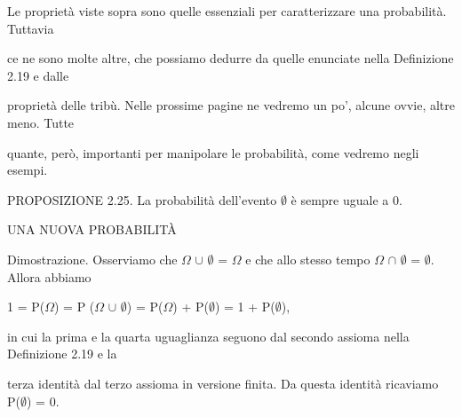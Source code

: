 \documentclass[a4paper,portrait,12pt]{article}
\begin{document}
\begin{flushleft}
Le propriet\`{a} viste sopra sono quelle essenziali per caratterizzare una probabilit\`{a}. Tuttavia
\end{flushleft}


\begin{flushleft}
ce ne sono molte altre, che possiamo dedurre da quelle enunciate nella Definizione 2.19 e dalle
\end{flushleft}


\begin{flushleft}
propriet\`{a} delle tribù. Nelle prossime pagine ne vedremo un po', alcune ovvie, altre meno. Tutte
\end{flushleft}


\begin{flushleft}
quante, per\`{o}, importanti per manipolare le probabilit\`{a}, come vedremo negli esempi.
\end{flushleft}


\begin{flushleft}
PROPOSIZIONE 2.25. La probabilit\`{a} dell'evento $\emptyset$ \`{e} sempre uguale a 0.
\end{flushleft}










\begin{flushleft}
UNA NUOVA PROBABILIT\`{A}
\end{flushleft}





\begin{flushleft}
Dimostrazione. Osserviamo che $\Omega$ $\cup$ $\emptyset$ = $\Omega$ e che allo stesso tempo $\Omega$ $\cap$ $\emptyset$ = $\emptyset$. Allora abbiamo
\end{flushleft}


\begin{flushleft}
1 = P($\Omega$) = P ($\Omega$ $\cup$ $\emptyset$) = P($\Omega$) + P($\emptyset$) = 1 + P($\emptyset$),
\end{flushleft}


\begin{flushleft}
in cui la prima e la quarta uguaglianza seguono dal secondo assioma nella Definizione 2.19 e la
\end{flushleft}


\begin{flushleft}
terza identit\`{a} dal terzo assioma in versione finita. Da questa identit\`{a} ricaviamo P($\emptyset$) = 0.
\end{flushleft}
\end{document}
